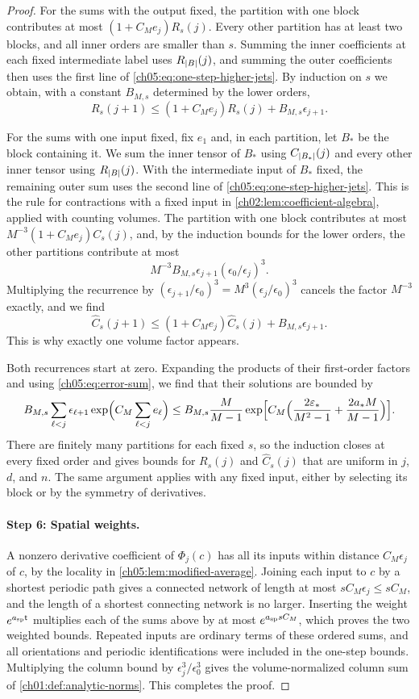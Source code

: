 \begin{proof}
For the sums with the output fixed, the partition with one block contributes at most $(1+C_Me_j)R_s(j)$. Every other partition has at least two blocks, and all inner orders are smaller than $s$. Summing the inner coefficients at each fixed intermediate label uses $R_{\lvert B\rvert}(j)$, and summing the outer coefficients then uses the first line of \eqref{ch05:eq:one-step-higher-jets}. By induction on $s$ we obtain, with a constant $B_{M,s}$ determined by the lower orders,
\[
 R_s(j+1)\le(1+C_Me_j)R_s(j)+B_{M,s}\epsilon_{j+1}.
\]

For the sums with one input fixed, fix $e_1$ and, in each partition, let $B_*$ be the block containing it. We sum the inner tensor of $B_*$ using $C_{\lvert B_*\rvert}(j)$ and every other inner tensor using $R_{\lvert B\rvert}(j)$. With the intermediate input of $B_*$ fixed, the remaining outer sum uses the second line of \eqref{ch05:eq:one-step-higher-jets}. This is the rule for contractions with a fixed input in \cref{ch02:lem:coefficient-algebra}, applied with counting volumes. The partition with one block contributes at most $M^{-3}(1+C_Me_j)C_s(j)$, and, by the induction bounds for the lower orders, the other partitions contribute at most
\[
 M^{-3}B_{M,s}\epsilon_{j+1}(\epsilon_0/\epsilon_j)^3.
\]
Multiplying the recurrence by $(\epsilon_{j+1}/\epsilon_0)^3=M^3(\epsilon_j/\epsilon_0)^3$ cancels the factor $M^{-3}$ exactly, and we find
\[
 \widehat C_s(j+1)\le(1+C_Me_j)\widehat C_s(j)+B_{M,s}\epsilon_{j+1}.
\]
This is why exactly one volume factor appears.

Both recurrences start at zero. Expanding the products of their first-order factors and using \eqref{ch05:eq:error-sum}, we find that their solutions are bounded by
\[
 B_{M,s}\sum_{\ell<j}\epsilon_{\ell+1}\exp\Bigl(C_M\sum_{\ell<j}e_\ell\Bigr)\le B_{M,s}\frac M{M-1}\exp\Bigl[C_M\Bigl(\frac{2\varepsilon_*}{M^2-1}+\frac{2a_*M}{M-1}\Bigr)\Bigr].
\]
There are finitely many partitions for each fixed $s$, so the induction closes at every fixed order and gives bounds for $R_s(j)$ and $\widehat C_s(j)$ that are uniform in $j$, $d$, and $n$. The same argument applies with any fixed input, either by selecting its block or by the symmetry of derivatives.

\paragraph{Step 6: Spatial weights.}
A nonzero derivative coefficient of $\Phi_j(c)$ has all its inputs within distance $C_M\epsilon_j$ of $c$, by the locality in \cref{ch05:lem:modified-average}. Joining each input to $c$ by a shortest periodic path gives a connected network of length at most $sC_M\epsilon_j\le sC_M$, and the length of a shortest connecting network is no larger. Inserting the weight $e^{a_{\mathrm{sp}}\mathsf t}$ multiplies each of the sums above by at most $e^{a_{\mathrm{sp}} sC_M}$, which proves the two weighted bounds. Repeated inputs are ordinary terms of these ordered sums, and all orientations and periodic identifications were included in the one-step bounds. Multiplying the column bound by $\epsilon_j^3/\epsilon_0^3$ gives the volume-normalized column sum of \cref{ch01:def:analytic-norms}. This completes the proof.
\end{proof}
